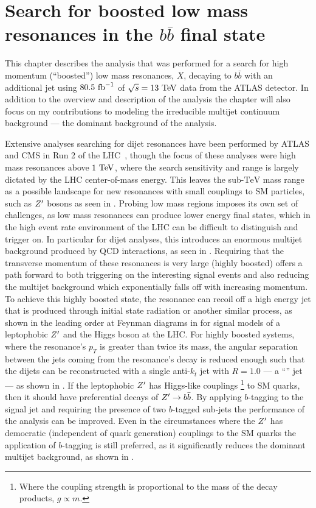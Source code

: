 \chapter{Search for boosted low mass resonances in the $b\bar{b}$ final state}\label{chapter:analysis}

This chapter describes the analysis that was performed for a search for high momentum (``boosted'') low mass resonances, $X$, decaying to $b\bar{b}$ with an additional jet using $80.5~\mathrm{fb}^{-1}$ of $\sqrt{s} = 13~\mathrm{TeV}$ data from the ATLAS detector.
In addition to the overview and description of the analysis the chapter will also focus on my contributions to modeling the irreducible multijet continuum background --- the dominant background of the analysis.

Extensive analyses searching for dijet resonances have been performed by ATLAS and CMS in Run 2 of the LHC~\cite{EXOT-2016-21,CMS-EXO-16-032,CMS-EXO-16-046}, though the focus of these analyses were high mass resonances above $1~\mathrm{TeV}$, where the search sensitivity and range is largely dictated by the LHC center-of-mass energy.
This leaves the sub-$\mathrm{TeV}$ mass range as a possible landscape for new resonances with small couplings to SM particles, such as $Z'$ bosons as seen in .
Probing low mass regions imposes its own set of challenges, as low mass resonances can produce lower energy final states, which in the high event rate environment of the LHC can be difficult to distinguish and trigger on.
In particular for dijet analyses, this introduces an enormous multijet background produced by QCD interactions, as seen in .
Requiring that the transverse momentum of these resonances is very large (highly boosted) offers a path forward to both triggering on the interesting signal events and also reducing the multijet background which exponentially falls off with increasing momentum.
To achieve this highly boosted state, the resonance can recoil off a high energy jet that is produced through initial state radiation or another similar process, as shown in the leading order at Feynman diagrams in  for signal models of a leptophobic $Z'$ and the Higgs boson at the LHC.
For highly boosted systems, where the resonance's $p_{T}$ is greater than twice its mass, the angular separation between the jets coming from the resonance's decay is reduced enough such that the dijets can be reconstructed with a single anti-$k_{t}$ jet with $R=1.0$ --- a ``\largeR{}'' jet --- as shown in .
If the leptophobic $Z'$ has Higgs-like couplings%
\footnote{Where the coupling strength is proportional to the mass of the decay products, $g \propto m$.}
to SM quarks, then it should have preferential decays of $Z' \to b\bar{b}$.
By applying $b$-tagging to the signal \largeR{} jet and requiring the presence of two $b$-tagged sub-jets the performance of the analysis can be improved.
Even in the circumstances where the $Z'$ has democratic (independent of quark generation) couplings to the SM quarks the application of $b$-tagging is still preferred, as it significantly reduces the dominant multijet background, as shown in .

